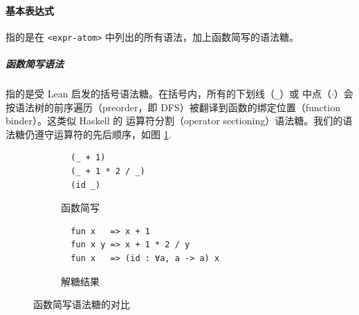 \paragraph*{基本表达式} 指的是在 \texttt{<expr-atom>} 中列出的所有语法，加上函数简写的语法糖。
{\setlength{\parskip}{-1em}\subparagraph*{函数简写语法} 指的是受 Lean 启发的括号语法糖。在括号内，所有的下划线（\texttt{\_}）或
  中点（$\cdot$）会按语法树的前序遍历（preorder，即 DFS）被翻译到函数的绑定位置（function binder）。这类似 Haskell 的
运算符分割（operator sectioning）语法糖。我们的语法糖仍遵守运算符的先后顺序，如图 \ref{code:func-shorthand}.}
\begin{figure}[H]
  \centering
  \begin{subfigure}{0.5\textwidth}\centering
\begin{verbatim}
  (_ + 1)
  (_ + 1 * 2 / _)
  (id _)
\end{verbatim}
    \caption{函数简写}
  \end{subfigure}%
  \begin{subfigure}{0.5\textwidth}\centering
\begin{verbatim}
  fun x   => x + 1
  fun x y => x + 1 * 2 / y
  fun x   => (id : ∀a, a -> a) x
\end{verbatim}
    \caption{解糖结果}
  \end{subfigure}
  \caption{函数简写语法糖的对比}\label{code:func-shorthand}
\end{figure}

